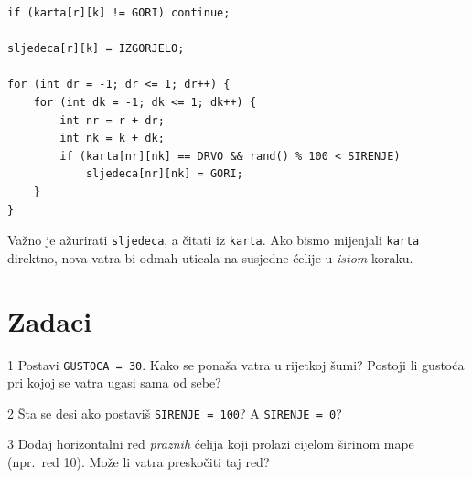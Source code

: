 \documentclass[11pt]{article}
\begin{document}
\begin{lstlisting}
if (karta[r][k] != GORI) continue;

sljedeca[r][k] = IZGORJELO;

for (int dr = -1; dr <= 1; dr++) {
    for (int dk = -1; dk <= 1; dk++) {
        int nr = r + dr;
        int nk = k + dk;
        if (karta[nr][nk] == DRVO && rand() % 100 < SIRENJE)
            sljedeca[nr][nk] = GORI;
    }
}
\end{lstlisting}

\begin{napomena}
    Važno je ažurirati \texttt{sljedeca}, a čitati iz \texttt{karta}.
    Ako bismo mijenjali \texttt{karta} direktno, nova vatra bi odmah
    uticala na susjedne ćelije u \emph{istom} koraku.
\end{napomena}

\section{Zadaci}

\begin{zadatak}{1}
Postavi \texttt{GUSTOCA = 30}. Kako se ponaša vatra u rijetkoj šumi?
Postoji li gustoća pri kojoj se vatra ugasi sama od sebe?
\end{zadatak}

\begin{zadatak}{2}
Šta se desi ako postaviš \texttt{SIRENJE = 100}? A \texttt{SIRENJE = 0}?
\end{zadatak}

\begin{zadatak}{3}
Dodaj horizontalni red \emph{praznih} ćelija koji prolazi cijelom širinom
mape (npr.\ red 10). Može li vatra preskočiti taj red?
\end{zadatak}
\end{document}
